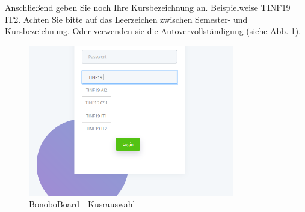 \documentclass[a4paper,11pt]{scrartcl}
\begin{document}
\bigskip
Anschließend geben Sie noch Ihre Kursbezeichnung an. Beispielweise \frqq{}TINF19 IT2\flqq{}. Achten Sie bitte auf das Leerzeichen zwischen Semester- und Kursbezeichnung. Oder verwenden sie die Autovervollständigung (siehe Abb. \ref{img:autocomplete}).
\begin{figure}[H]
	\begin{center}
		\includegraphics[width=0.8\textwidth]{autocomplete}
		\caption{BonoboBoard - Kusrauswahl}
		\label{img:autocomplete}
	\end{center}
\end{figure}
\noindent


\end{document}
